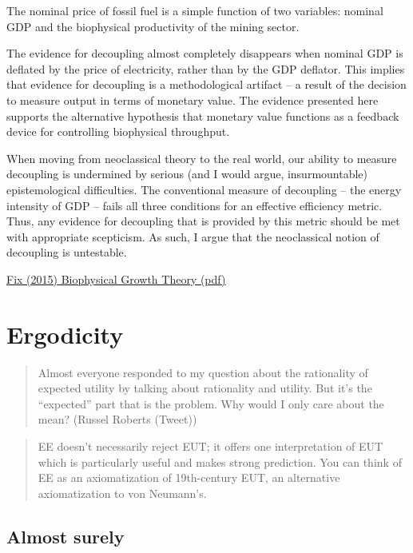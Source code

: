 \documentclass[
]{book}
\begin{document}
The nominal price of fossil fuel is a simple function of two
variables: nominal GDP and the biophysical productivity of the mining sector.

The evidence for decoupling almost completely disappears when nominal GDP
is deflated by the price of electricity, rather than by the GDP deflator.
This implies that evidence for decoupling
is a methodological artifact -- a result of the decision to measure output in terms
of monetary value. The evidence presented here supports the alternative hypothesis
that monetary value functions as a feedback device for controlling biophysical
throughput.

When moving from neoclassical theory to the real world, our ability to
measure decoupling is undermined by serious (and I would argue, insurmountable)
epistemological difficulties. The conventional measure of decoupling -- the energy
intensity of GDP -- fails all three conditions for an effective efficiency metric. Thus,
any evidence for decoupling that is provided by this metric should be met with
appropriate scepticism. As such, I argue that the neoclassical notion of decoupling
is untestable.

\href{PDF/Fix_2015_Biophysical_Growth_Theory.pdf}{Fix (2015) Biophysical Growth Theory (pdf)}

\hypertarget{ergodicity}{%
\chapter{Ergodicity}\label{ergodicity}}

\begin{quote}
Almost everyone responded to my question about the rationality of expected utility by talking about rationality and utility. But it's the ``expected'' part that is the problem. Why would I only care about the mean? (Russel Roberts (Tweet))
\end{quote}

\begin{quote}
EE doesn't necessarily reject EUT; it offers one interpretation of EUT which is particularly useful and makes strong prediction. You can think of EE as an axiomatization of 19th-century EUT, an alternative axiomatization to von Neumann's.
\end{quote}

\hypertarget{almost-surely}{%
\section{Almost surely}\label{almost-surely}}
\end{document}
